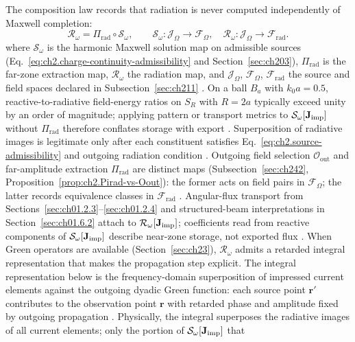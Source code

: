 The composition law records that radiation is never computed independently of
Maxwell completion:
\begin{equation}
\label{eq:ch2.operator-composition}
\mathcal{R}_\omega
=
\Pi_{\mathrm{rad}}\circ\mathcal{S}_\omega,
\qquad
\mathcal{S}_\omega:\mathcal{J}_\Omega\to\mathcal{F}_\Omega,
\quad
\mathcal{R}_\omega:\mathcal{J}_\Omega\to\mathcal{F}_{\mathrm{rad}}.
\end{equation}
where $\mathcal{S}_\omega$ is the harmonic Maxwell solution map on admissible sources (Eq.~\eqref{eq:ch2.charge-continuity-admissibility} and Section~\ref{sec:ch203}), $\Pi_{\mathrm{rad}}$ is the far-zone extraction map, $\mathcal{R}_\omega$ the radiation map, and $\mathcal{J}_\Omega$, $\mathcal{F}_\Omega$, $\mathcal{F}_{\mathrm{rad}}$ the source and field spaces declared in Subsection~\ref{sec:ch211} \cite{stratton1941}. On a ball
$B_a$ with $k_0 a=0.5$, reactive-to-radiative field-energy ratios on $S_R$ with $R=2a$
typically exceed unity by an order of magnitude; applying pattern or transport metrics to
$\mathcal{S}_\omega[\mathbf{J}_{\mathrm{imp}}]$ without $\Pi_{\mathrm{rad}}$ therefore conflates storage with
export \cite{jackson1999}. Superposition of radiative images is legitimate only after each
constituent satisfies Eq.~\eqref{eq:ch2.source-admissibility} and outgoing radiation
condition \cite{harrington2001}. Outgoing field selection $\mathcal{O}_{\mathrm{out}}$ and far-amplitude extraction $\Pi_{\mathrm{rad}}$
are distinct maps (Subsection~\ref{sec:ch242}, Proposition~\ref{prop:ch2.Pirad-vs-Oout}): the former acts on
field pairs in $\mathcal{F}_\Omega$; the latter records equivalence classes in $\mathcal{F}_{\mathrm{rad}}$
\cite{stratton1941}. Angular-flux
transport from Sections~\ref{sec:ch01.2.3}--\ref{sec:ch01.2.4} and structured-beam
interpretations in Section~\ref{sec:ch01.6.2} attach to $\mathcal{R}_\omega[\mathbf{J}_{\mathrm{imp}}]$;
coefficients read from reactive components of $\mathcal{S}_\omega[\mathbf{J}_{\mathrm{imp}}]$ describe
near-zone storage, not exported flux \cite{allen1992}.
When Green operators are available (Section~\ref{sec:ch23}), \(\mathcal{R}_\omega\)
admits a retarded integral representation that makes the propagation step explicit.
The integral representation below is the frequency-domain superposition of impressed
current elements against the outgoing dyadic Green function: each source point
\(\mathbf{r}'\) contributes to the observation point \(\mathbf{r}\) with retarded phase and
amplitude fixed by outgoing propagation \cite{stratton1941}. Physically, the integral superposes the radiative
images of all current elements; only the portion of \(\mathcal{S}_\omega[\mathbf{J}_{\mathrm{imp}}]\) that
